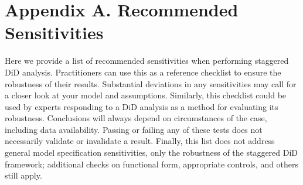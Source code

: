 \documentclass[12pt]{article}
\begin{document}
\section*{Appendix A. Recommended Sensitivities} \label{sec:appendixa}
Here we provide a list of recommended sensitivities when performing staggered DiD analysis. Practitioners can use this as a reference checklist to ensure the robustness of their results. Substantial deviations in any sensitivities may call for a closer look at your model and assumptions. Similarly, this checklist could be used by experts responding to a DiD analysis as a method for evaluating its robustness. Conclusions will always depend on circumstances of the case, including data availability. Passing or failing any of these tests does not necessarily validate or invalidate a result. Finally, this list does not address general model specification sensitivities, only the robustness of the staggered DiD framework; additional checks on functional form, appropriate controls, and others still apply.
\end{document}

